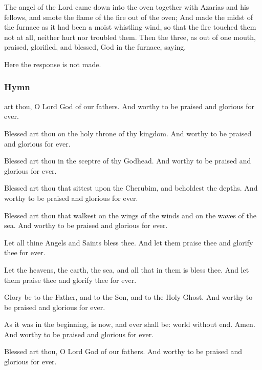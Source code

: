  The angel of the Lord came down into the oven together with Azarias and his fellows, and smote the flame of the fire out of the oven; And made the midst of the furnace as it had been a moist whistling wind, so that the fire touched them not at all, neither hurt nor troubled them. Then the three, as out of one mouth, praised, glorified, and blessed, God in the furnace, saying,
\begin{rubric}
    Here the response  is not made.
\end{rubric}

\subsubsection{Hymn}
 art thou, O Lord God of our fathers. And worthy to be praised and glorious for ever.\par
{}

Blessed art thou on the holy throne of thy kingdom. And worthy to be praised and glorious for ever.

Blessed art thou in the sceptre of thy Godhead. And worthy to be praised and glorious for ever.

Blessed art thou that sittest upon the Cherubim, and beholdest the depths. And worthy to be praised and glorious for ever.

Blessed art thou that walkest on the wings of the winds and on the waves of the sea. And worthy to be praised and glorious for ever.

Let all thine Angels and Saints bless thee. And let them praise thee and glorify thee for ever.

Let the heavens, the earth, the sea, and all that in them is bless thee. And let them praise thee and glorify thee for ever.

Glory be to the Father, and to the Son, and to the Holy Ghost. And worthy to be praised and glorious for ever.

As it was in the beginning, is now, and ever shall be: world without end. Amen. And worthy to be praised and glorious for ever.

Blessed art thou, O Lord God of our fathers. And worthy to be praised and glorious for ever.\\

